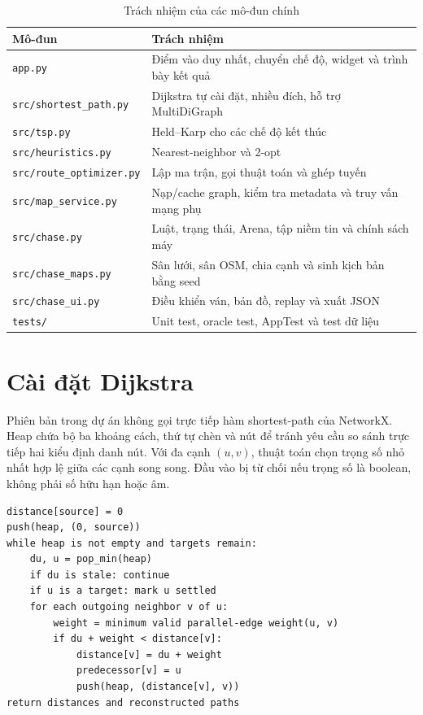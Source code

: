\begin{table}[H]
\centering
\caption{Trách nhiệm của các mô-đun chính}
\begin{tabularx}{\linewidth}{p{5.3cm}Y}
\toprule
\textbf{Mô-đun} & \textbf{Trách nhiệm} \\
\midrule
\texttt{app.py} & Điểm vào duy nhất, chuyển chế độ, widget và trình bày kết quả \\
\texttt{src/shortest\_path.py} & Dijkstra tự cài đặt, nhiều đích, hỗ trợ MultiDiGraph \\
\texttt{src/tsp.py} & Held--Karp cho các chế độ kết thúc \\
\texttt{src/heuristics.py} & Nearest-neighbor và 2-opt \\
\texttt{src/route\_optimizer.py} & Lập ma trận, gọi thuật toán và ghép tuyến \\
\texttt{src/map\_service.py} & Nạp/cache graph, kiểm tra metadata và truy vấn mạng phụ \\
\texttt{src/chase.py} & Luật, trạng thái, Arena, tập niềm tin và chính sách máy \\
\texttt{src/chase\_maps.py} & Sân lưới, sân OSM, chia cạnh và sinh kịch bản bằng seed \\
\texttt{src/chase\_ui.py} & Điều khiển ván, bản đồ, replay và xuất JSON \\
\texttt{tests/} & Unit test, oracle test, AppTest và test dữ liệu \\
\bottomrule
\end{tabularx}
\end{table}

\section{Cài đặt Dijkstra}

Phiên bản trong dự án không gọi trực tiếp hàm shortest-path của NetworkX. Heap
chứa bộ ba khoảng cách, thứ tự chèn và nút để tránh yêu cầu so sánh trực tiếp hai
kiểu định danh nút. Với đa cạnh $(u,v)$, thuật toán chọn trọng số nhỏ nhất hợp lệ
giữa các cạnh song song. Đầu vào bị từ chối nếu trọng số là boolean, không phải
số hữu hạn hoặc âm.

\begin{lstlisting}[float,caption={Giả mã Dijkstra nhiều đích},label={lst:dijkstra}]
distance[source] = 0
push(heap, (0, source))
while heap is not empty and targets remain:
    du, u = pop_min(heap)
    if du is stale: continue
    if u is a target: mark u settled
    for each outgoing neighbor v of u:
        weight = minimum valid parallel-edge weight(u, v)
        if du + weight < distance[v]:
            distance[v] = du + weight
            predecessor[v] = u
            push(heap, (distance[v], v))
return distances and reconstructed paths
\end{lstlisting}

